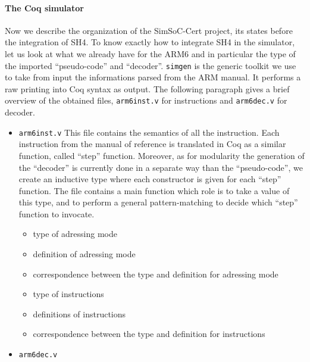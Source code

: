 \documentclass[a4paper, 11pt]{article}
\newcommand{\simgen}{{\tt simgen}\xspace}
\begin{document}
\paragraph{The Coq simulator}
Now we describe the organization of the SimSoC-Cert project, its states before the integration of SH4. To know exactly how to integrate SH4 in the simulator, let us look at what we already have for the ARM6 and in particular the type of the imported ``pseudo-code'' and ``decoder''.
\simgen is the generic toolkit we use to take from input the informations parsed from the ARM manual. It performs a raw printing into Coq syntax as output. The following paragraph gives a brief overview of the obtained files, \verb|arm6inst.v| for instructions and \verb|arm6dec.v| for decoder.
\begin{itemize}
\item \verb|arm6inst.v|
This file contains the semantics of all the instruction. Each instruction from the manual of reference is translated in Coq as a similar function, called ``step'' function. Moreover, as for modularity the generation of the ``decoder'' is currently done in a separate way than the ``pseudo-code'', we create an inductive type where each constructor is given for each ``step'' function.
The file contains a main function which role is to take a value of this type, and to perform a general pattern-matching to decide which ``step'' function to invocate.

  \begin{itemize}
  \item type of adressing mode
  \item definition of adressing mode
  \item correspondence between the type and definition for adressing mode
  \item type of instructions
  \item definitions of instructions
  \item correspondence between the type and definition for instructions
  \end{itemize}
\item \verb|arm6dec.v|

\end{itemize}
\end{document}

